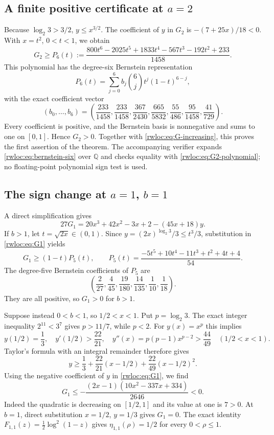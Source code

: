 \subsection{A finite positive certificate at \texorpdfstring{$a=2$}{a = 2}}
Because $\log_2 3>3/2$, $y\le x^{3/2}$. The coefficient of $y$
in $G_2$ is $-(7+25x)/18<0$. With $x=t^2$, $0<t<1$, we obtain
\begin{equation}\label{rwloc:eq:G2-polynomial}
 G_2\ge P_6(t):=
 \frac{800t^6-2025t^5+1833t^4-567t^3-192t^2+233}{1458}.
\end{equation}
This polynomial has the degree-six Bernstein representation
\[
 P_6(t)=\sum_{j=0}^6 b_j\binom6j t^j(1-t)^{6-j},
\]
with the exact coefficient vector
\begin{equation}\label{rwloc:eq:bernstein-six}
 (b_0,\ldots,b_6)=
 \left(\frac{233}{1458},\frac{233}{1458},\frac{367}{2430},
 \frac{665}{5832},\frac{55}{486},\frac{95}{1458},\frac{41}{729}\right).
\end{equation}
Every coefficient is positive, and the Bernstein basis is nonnegative
and sums to one on $[0,1]$. Hence $G_2>0$. Together with
\eqref{rwloc:eq:G-increasing}, this proves the first assertion of the theorem.
The accompanying verifier expands \eqref{rwloc:eq:bernstein-six} over
$\mathbb Q$ and checks equality with \eqref{rwloc:eq:G2-polynomial}; no
floating-point polynomial sign test is used.

\subsection{The sign change at \texorpdfstring{$a=1$, $b=1$}{a = 1, b = 1}}
A direct simplification gives
\begin{equation}\label{rwloc:eq:G1}
 27G_1=20x^3+42x^2-3x+2-(45x+18)y.
\end{equation}
If $b>1$, let $t=\sqrt{2x}\in(0,1)$. Since
$y=(2x)^{\log_2 3}/3\le t^3/3$, substitution in
\eqref{rwloc:eq:G1} yields
\[
 G_1\ge(1-t)P_5(t),\qquad
 P_5(t)=\frac{-5t^5+10t^4-11t^3+t^2+4t+4}{54}.
\]
The degree-five Bernstein coefficients of $P_5$ are
\begin{equation}\label{rwloc:eq:bernstein-five}
 \left(\frac2{27},\frac4{45},\frac{19}{180},
       \frac{14}{135},\frac1{10},\frac1{18}\right).
\end{equation}
They are all positive, so $G_1>0$ for $b>1$.

Suppose instead $0<b<1$, so $1/2<x<1$. Put $p=\log_2 3$.
The exact integer inequality $2^{11}<3^7$ gives $p>11/7$, while
$p<2$. For $y(x)=x^p$ this implies
\[
 y(1/2)=\frac13,\quad y'(1/2)>\frac{22}{21},\quad
 y''(x)=p(p-1)x^{p-2}>\frac{44}{49}\quad(1/2<x<1).
\]
Taylor's formula with an integral remainder therefore gives
\[
 y\ge\frac13+\frac{22}{21}(x-1/2)
                   +\frac{22}{49}(x-1/2)^2.
\]
Using the negative coefficient of $y$ in \eqref{rwloc:eq:G1}, we find
\[
 G_1\le-\frac{(2x-1)(10x^2-337x+334)}{2646}<0.
\]
Indeed the quadratic is decreasing on $[1/2,1]$ and its value at
one is $7>0$. At $b=1$, direct substitution $x=1/2$, $y=1/3$
gives $G_1=0$. The exact identity
$F_{1,1}(z)=\tfrac12\log^2(1-z)$ gives
$\eta_{1,1}(\rho)=1/2$ for every $0<\rho\le1$.


